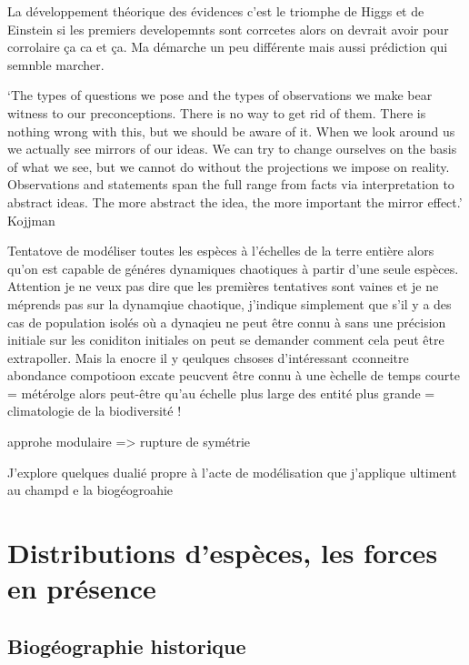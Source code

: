La développement théorique des évidences c'est le triomphe de Higgs et
de Einstein si les premiers developemnts sont corrcetes alors on devrait
avoir pour corrolaire ça ca et ça. Ma démarche un peu différente mais
aussi prédiction qui semnble marcher.

`The types of questions we pose and the types of observations we make
bear witness to our preconceptions. There is no way to get rid of them.
There is nothing wrong with this, but we should be aware of it. When we
look around us we actually see mirrors of our ideas. We can try to
change ourselves on the basis of what we see, but we cannot do without
the projections we impose on reality. Observations and statements span
the full range from facts via interpretation to abstract ideas. The more
abstract the idea, the more important the mirror effect.' Kojjman

Tentatove de modéliser toutes les espèces à l'échelles de la terre
entière alors qu'on est capable de généres dynamiques chaotiques à
partir d'une seule espèces. Attention je ne veux pas dire que les
premières tentatives sont vaines et je ne méprends pas sur la dynamqiue
chaotique, j'indique simplement que s'il y a des cas de population
isolés où a dynaqieu ne peut être connu à sans une précision initiale
sur les coniditon initiales on peut se demander comment cela peut être
extrapoller. Mais la enocre il y qeulques chsoses d'intéressant
cconneitre abondance compotioon excate peucvent être connu à une èchelle
de temps courte = métérolge alors peut-être qu'au échelle plus large des
entité plus grande = climatologie de la biodiversité !

approhe modulaire =\textgreater{} rupture de symétrie

J'explore quelques dualié propre à l'acte de modélisation que j'applique
ultiment au champd e la biogéogroahie

\section*{Distributions d'espèces, les forces en
présence}\label{distributions-despuxe8ces-les-forces-en-pruxe9sence}

\subsection*{Biogéographie
historique}\label{bioguxe9ographie-historique}

